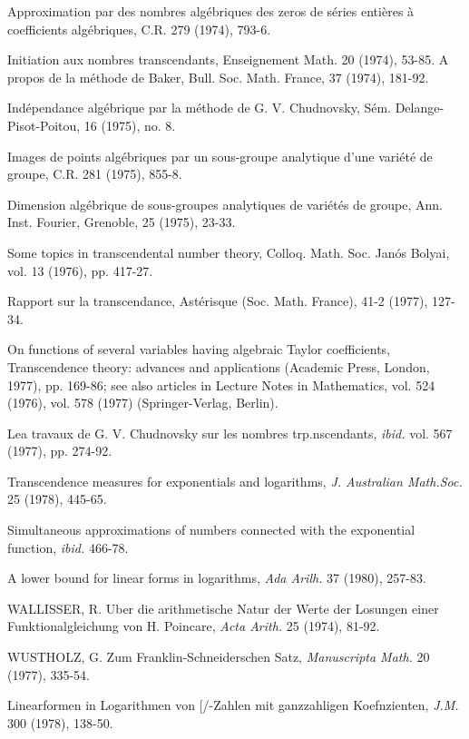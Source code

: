 \begin{hanglist}
    \item \hspace{1.5em} Approximation par des nombres algébriques des zeros de séries entières à coefficients algébriques, C.R. 279 (1974), 793-6.
    \item \hspace{1.5em} Initiation aux nombres transcendants, Enseignement Math. 20 (1974), 53-85. A propos de la méthode de Baker, Bull. Soc. Math. France, 37 (1974), 181-92.
    \item \hspace{1.5em} Indépendance algébrique par la méthode de G. V. Chudnovsky, Sém. Delange-Pisot-Poitou, 16 (1975), no. 8.
    \item \hspace{1.5em} Images de points algébriques par un sous-groupe analytique d'une variété de groupe, C.R. 281 (1975), 855-8.
    \item \hspace{1.5em} Dimension algébrique de sous-groupes analytiques de variétés de groupe, Ann. Inst. Fourier, Grenoble, 25 (1975), 23-33.
    \item \hspace{1.5em} Some topics in transcendental number theory, Colloq. Math. Soc. Janós Bolyai, vol. 13 (1976), pp. 417-27.
    \item \hspace{1.5em} Rapport sur la transcendance, Astérisque (Soc. Math. France), 41-2 (1977), 127-34.
    \item \hspace{1.5em} On functions of several variables having algebraic Taylor coefficients, Transcendence theory: advances and applications (Academic Press, London, 1977), pp. 169-86; see also articles in Lecture Notes in Mathematics, vol. 524 (1976), vol. 578 (1977) (Springer-Verlag, Berlin).
    \item Lea travaux de G. V. Chudnovsky sur les nombres trp.nscendants, \textit{ibid.} vol. 567 (1977), pp. 274-92.
    \item Transcendence measures for exponentials and logarithms, \textit{J. Australian Math.Soc.} 25 (1978), 445-65.
    \item Simultaneous approximations of numbers connected with the exponential function, \textit{ibid.} 466-78.
    \item A lower bound for linear forms in logarithms, \textit{Ada Arilh.} 37 (1980), 257-83.
    \item WALLISSER, R. Uber die arithmetische Natur der Werte der Losungen einer Funktionalgleichung von H. Poincare, \textit{Acta Arith.} 25 (1974), 81-92.
    \item WUSTHOLZ, G. Zum Franklin-Schneiderschen Satz, \textit{Manuscripta Math.} 20 (1977), 335-54.
    \item \hspace{1.5em} Linearformen in Logarithmen von [/-Zahlen mit ganzzahligen Koefnzienten, \textit{J.M.} 300 (1978), 138-50.
\end{hanglist}
